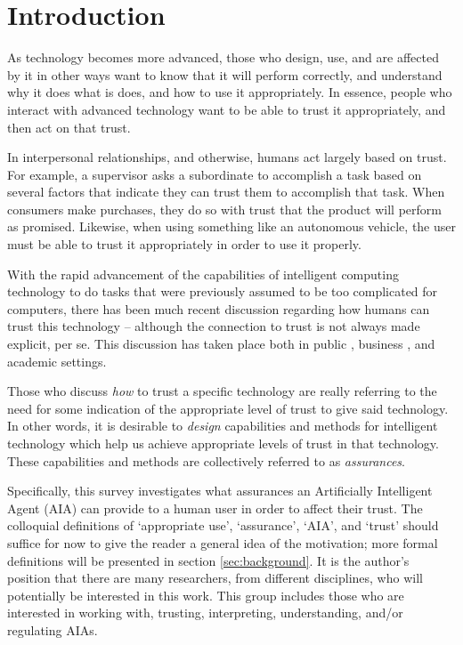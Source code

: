 \section{Introduction}
    As technology becomes more advanced, those who design, use, and are affected by it in other ways want to know that it will perform correctly, and understand why it does what is does, and how to use it appropriately. In essence, people who interact with advanced technology want to be able to trust it appropriately, and then act on that trust.

    In interpersonal relationships, and otherwise, humans act largely based on trust. For example, a supervisor asks a subordinate to accomplish a task based on several factors that indicate they can trust them to accomplish that task. When consumers make purchases, they do so with trust that the product will perform as promised. Likewise, when using something like an autonomous vehicle, the user must be able to trust it appropriately in order to use it properly.

    With the rapid advancement of the capabilities of intelligent computing technology to do tasks that were previously assumed to be too complicated for computers, there has been much recent discussion regarding how humans can trust this technology -- although the connection to trust is not always made explicit, per se. This discussion has taken place both in public \cite{Spectrum2016-jv,DeSteno2014-cq,Cranz2017-yh,Cassel2017-tn,Danks2017-sb,Wagner2016-ck}, business \cite{Banavar2016-nm, Khosravi2016-ke,Moody2017-vd,Rudnitsky2017-in,Benioff2016-tc,Tankard2016-rk}, and academic \cite{Groom2007-bz,Lloyd2014-bb,Goodrum_2016-fm,Foley2017-qj,Ghahramani2015-yq,Castelvecchi2016-mr} settings.

    Those who discuss \emph{how} to trust a specific technology are really referring to the need for some indication of the appropriate level of trust to give said technology. In other words, it is desirable to \emph{design} capabilities and methods for intelligent technology which help us achieve appropriate levels of trust in that technology. These capabilities and methods are collectively referred to as \emph{assurances}.
    
    Specifically, this survey investigates what assurances an Artificially Intelligent Agent (AIA) can provide to a human user in order to affect their trust. The colloquial definitions of `appropriate use', `assurance', `AIA', and `trust' should suffice for now to give the reader a general idea of the motivation; more formal definitions will be presented in section \ref{sec:background}. It is the author's position that there are many researchers, from different disciplines, who will potentially be interested in this work. This group includes those who are interested in working with, trusting, interpreting, understanding, and/or regulating AIAs.

